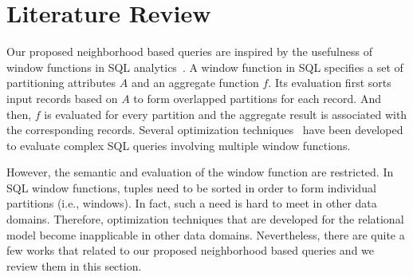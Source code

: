 \chapter{Literature Review}
Our proposed neighborhood based queries are inspired
by the usefulness of window functions in SQL analytics~\cite{zemke2012s}.
A window function in SQL specifies a set of partitioning attributes 
$A$ and an aggregate function $f$.
Its evaluation first sorts input records based on $A$ to form
overlapped partitions for each record. And then, $f$
is evaluated for every partition and the aggregate result is associated
with the corresponding records.
Several optimization techniques~\cite{cao2012optimization, bellamkonda2013adaptive}
have been developed to evaluate complex SQL queries 
involving multiple window functions.

However, the semantic and evaluation of the window function are restricted.
 In SQL window functions, tuples need to be sorted in order to form individual partitions (i.e., windows).
In fact, such a need is hard to meet in other data domains. Therefore, optimization techniques
that are developed for the relational model become inapplicable in other data domains. 
Nevertheless, there are quite a few works that related to our proposed neighborhood based
queries and we review them in this section. 




